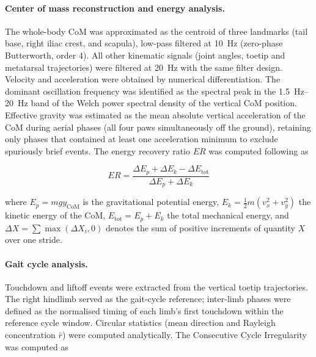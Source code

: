\documentclass[blue]{enslyonstage}
\begin{document}
\paragraph{Center of mass reconstruction and energy analysis.}
The whole-body CoM was approximated as the centroid of three landmarks (tail
base, right iliac crest, and scapula), low-pass filtered at \qty{10}{\hertz}
(zero-phase Butterworth, order 4)\cite{signaldevelopersSignalSignalProcessing2023}.
All other kinematic signals (joint angles, toetip and metatarsal trajectories)
were filtered at \qty{20}{\hertz} with the same filter design. Velocity and
acceleration were obtained by numerical
differentiation\cite{borchersPracmaPracticalNumerical2011}. The dominant
oscillation frequency was identified as the spectral peak in the
\qtyrange{1.5}{20}{\hertz} band of the Welch power spectral density of the
vertical CoM position. Effective gravity was estimated as the mean absolute
vertical acceleration of the CoM during aerial phases (all four paws
simultaneously off the ground), retaining only phases that contained at least
one acceleration minimum to exclude spuriously brief events.
The energy recovery ratio $ER$ was computed following
\citeauthor{cavagnaSourcesExternalWork1976}\cite{cavagnaSourcesExternalWork1976}
as

\begin{equation}
    ER = \frac{\Delta E_p + \Delta E_k - \Delta E_\text{tot}}{\Delta E_p + \Delta E_k}
    \label{eq:er}
\end{equation}

\noindent where $E_p = mgy_\text{CoM}$ is the gravitational potential energy,
$E_k = \tfrac{1}{2}m(v_x^2 + v_y^2)$ the kinetic energy of the CoM,
$E_\text{tot} = E_p + E_k$ the total mechanical energy, and
$\Delta X = \sum \max(\Delta X_i, 0)$ denotes the sum of positive increments of
quantity $X$ over one stride.

\paragraph{Gait cycle analysis.}
Touchdown and liftoff events were extracted from the vertical toetip
trajectories. The right hindlimb served as the gait-cycle reference; inter-limb
phases were defined as the normalised timing of each limb's first touchdown
within the reference cycle window. Circular statistics (mean direction and
Rayleigh concentration $\bar r$) were computed
analytically\cite{mardiaDirectionalStatistics1999}.
The Consecutive Cycle Irregularity was computed as
\end{document}
